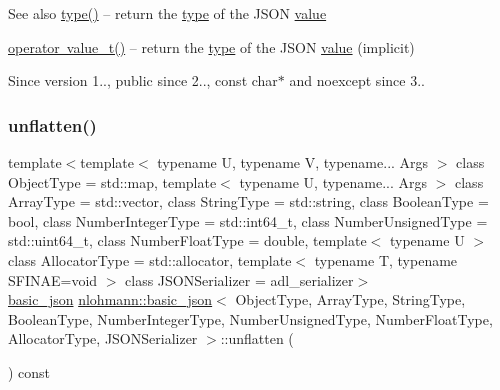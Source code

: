 \begin{DoxySeeAlso}{See also}
\mbox{\hyperlink{classnlohmann_1_1basic__json_a2b2d781d7f2a4ee41bc0016e931cadf7}{type()}} -- return the \mbox{\hyperlink{classnlohmann_1_1basic__json_a2b2d781d7f2a4ee41bc0016e931cadf7}{type}} of the J\+S\+ON \mbox{\hyperlink{classnlohmann_1_1basic__json_adcf8ca5079f5db993820bf50036bf45d}{value}} 

\mbox{\hyperlink{classnlohmann_1_1basic__json_a26ef3058e249f82a04f8ec18f7419027}{operator value\+\_\+t()}} -- return the \mbox{\hyperlink{classnlohmann_1_1basic__json_a2b2d781d7f2a4ee41bc0016e931cadf7}{type}} of the J\+S\+ON \mbox{\hyperlink{classnlohmann_1_1basic__json_adcf8ca5079f5db993820bf50036bf45d}{value}} (implicit)
\end{DoxySeeAlso}
\begin{DoxySince}{Since}
version 1.., public since 2.., {\ttfamily const char$\ast$} and {\ttfamily noexcept} since 3.. 
\end{DoxySince}
\mbox{\label{classnlohmann_1_1basic__json_a74fa3ab2003f2f6f2b69deaafed9126d}} 
\subsubsection{\texorpdfstring{unflatten()}{unflatten()}}
{\footnotesize\ttfamily template$<$template$<$ typename U, typename V, typename... Args $>$ class Object\+Type = std\+::map, template$<$ typename U, typename... Args $>$ class Array\+Type = std\+::vector, class String\+Type  = std\+::string, class Boolean\+Type  = bool, class Number\+Integer\+Type  = std\+::int64\+\_\+t, class Number\+Unsigned\+Type  = std\+::uint64\+\_\+t, class Number\+Float\+Type  = double, template$<$ typename U $>$ class Allocator\+Type = std\+::allocator, template$<$ typename T, typename S\+F\+I\+N\+A\+E=void $>$ class J\+S\+O\+N\+Serializer = adl\+\_\+serializer$>$ \\
\mbox{\hyperlink{classnlohmann_1_1basic__json}{basic\+\_\+json}} \mbox{\hyperlink{classnlohmann_1_1basic__json}{nlohmann\+::basic\+\_\+json}}$<$ Object\+Type, Array\+Type, String\+Type, Boolean\+Type, Number\+Integer\+Type, Number\+Unsigned\+Type, Number\+Float\+Type, Allocator\+Type, J\+S\+O\+N\+Serializer $>$\+::unflatten (\begin{DoxyParamCaption}{ }\end{DoxyParamCaption}) const\hspace{0.3cm}{\ttfamily [inline]}}



